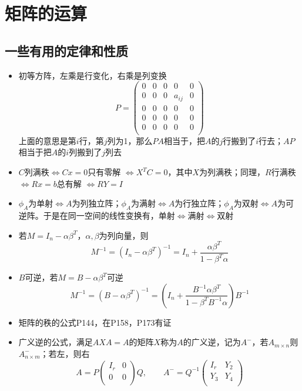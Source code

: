 \documentclass[UTF8]{ctexart}
\begin{document}
\section{矩阵的运算}
\subsection{一些有用的定律和性质}
\begin{itemize}
\item 初等方阵，左乘是行变化，右乘是列变换
\[
P = \left(
\begin{array}{ccccc}
0 & 0 & 0 & 0 & 0 \\
0 & 0 & 0 & a_{ij} & 0 \\
0 & 0 & 0 & 0 & 0 \\
0 & 0 & 0 & 0 & 0 \\
0 & 0 & 0 & 0 & 0 \\
\end{array}
\right)
\]
上面的意思是第$i$行，第$j$列为1，那么$PA$相当于，把$A$的$j$行搬到了$i$行去；$AP$相当于把$A$的$i$列搬到了$j$列去
\item $C$列满秩$\Leftrightarrow Cx=0$只有零解 $\Leftrightarrow X^TC=0$，其中$X$为列满秩；同理，$R$行满秩$\Leftrightarrow Rx=b$总有解 $\Leftrightarrow RY=I$

\item $\phi_A$为单射$\Leftrightarrow A$为列独立阵；$\phi_A$为满射$\Leftrightarrow A$为行独立阵；$\phi_A$为双射$\Leftrightarrow A$为可逆阵。于是在同一空间的线性变换有，单射$\Leftrightarrow$满射$\Leftrightarrow$双射

\item 若$M=I_n-\alpha\beta^T$，$\alpha,\beta$为列向量，则
\[
M^{-1} = (I_n-\alpha\beta^T)^{-1} = I_n +\frac{\alpha\beta^T}{1-\beta^T\alpha}
\]

\item $B$可逆，若$M=B-\alpha\beta^T$可逆
\[
M^{-1} = (B-\alpha\beta^T)^{-1} = \left(I_n +\frac{B^{-1}\alpha\beta^T}{1-\beta^TB^{-1}\alpha}\right)B^{-1}
\]
\item 矩阵的秩的公式P144，在P158，P173有证
\item 广义逆的公式，满足$AXA=A$的矩阵$X$称为$A$的广义逆，记为$A^-$，若$A_{m\times n}$则$A_{n\times m}^-$；若左，则右
\[
A=P\left(
\begin{array}{cc}
I_r & 0\\
0 & 0\\
\end{array}
\right)Q,\qquad A^- = Q^{-1}\left(
\begin{array}{cc}
I_r & Y_2\\
Y_3 & Y_4\\
\end{array}
\right)
\]
\end{itemize}
\end{document}
